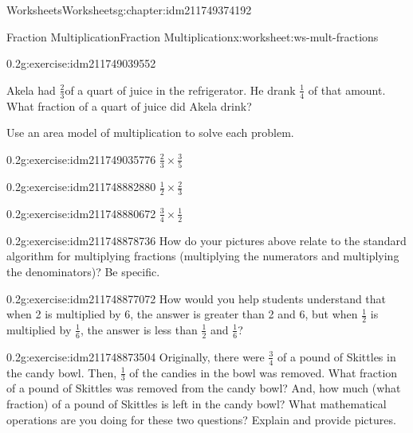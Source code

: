 \documentclass[twoside,11pt,]{book}
\begin{document}
\begin{chapterptx}{Worksheets}{}{Worksheets}{}{}{g:chapter:idm211749374192}
\begin{worksheet-section-numberless}{Fraction Multiplication}{}{Fraction Multiplication}{}{}{x:worksheet:ws-mult-fractions}
\begin{divisionexercise}{6}{}{0.2}{g:exercise:idm211749039552}
\par
Akela had \(\frac{2}{3} \)of a quart of juice in the refrigerator.  He drank \(\frac{1}{4} \) of that amount. What fraction of a quart of juice did Akela drink?%
\end{divisionexercise}%
\begin{introduction}{}%
Use an area model of multiplication to solve each problem.%
\end{introduction}%
\begin{divisionexercise}{7}{}{0.2}{g:exercise:idm211749035776}%
\(\frac{2}{3} \times \frac{3}{5} \)%
\end{divisionexercise}%
\begin{divisionexercise}{8}{}{0.2}{g:exercise:idm211748882880}%
\(\frac{1}{2} \times \frac{2}{3} \)%
\end{divisionexercise}%
\clearpage
\begin{divisionexercise}{9}{}{0.2}{g:exercise:idm211748880672}%
\(\frac{3}{4} \times \frac{1}{2} \)%
\end{divisionexercise}%
\begin{divisionexercise}{10}{}{0.2}{g:exercise:idm211748878736}%
How do your pictures above relate to the standard algorithm for multiplying fractions (multiplying the numerators and multiplying the denominators)? Be specific.%
\end{divisionexercise}%
\begin{divisionexercise}{11}{}{0.2}{g:exercise:idm211748877072}%
How would you help students understand that when 2 is multiplied by 6, the answer is greater than 2 and 6, but when \(\frac{1}{2} \) is multiplied by \(\frac{1}{6} \), the answer is less than \(\frac{1}{2} \) and \(\frac{1}{6} \)?%
\end{divisionexercise}%
\clearpage
\begin{divisionexercise}{12}{}{0.2}{g:exercise:idm211748873504}%
Originally, there were \(\frac{3}{4} \) of a pound of Skittles in the candy bowl. Then, \(\frac{1}{3} \) of the candies in the bowl was removed. What fraction of a pound of Skittles was removed from the candy bowl? And, how much (what fraction) of a pound of Skittles is left in the candy bowl? What mathematical operations are you doing for these two questions? Explain and provide pictures.%
\end{divisionexercise}%
\end{worksheet-section-numberless}
\restoregeometry
%
%
\typeout{************************************************}

\end{chapterptx}
\end{document}
